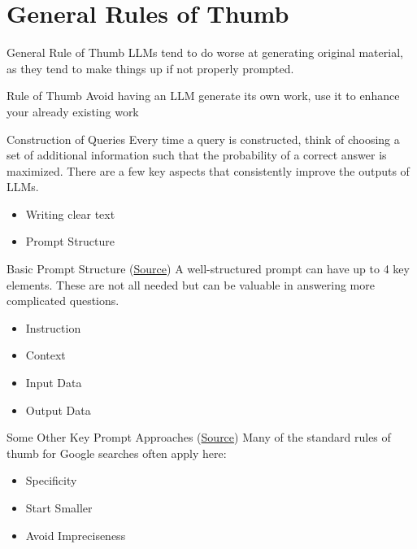 \documentclass[
	11pt, %
	aspectratio=169, %
]{beamer}
\begin{document}
\section{General Rules of Thumb}
\begin{frame}{General Rule of Thumb}\label{Rule of Thumb}
    LLMs tend to do worse at generating original material, as they tend to make things up if not properly prompted.
    \bigbreak 
    \begin{block}{Rule of Thumb}
        Avoid having an LLM generate its own work, use it to enhance your already existing work
    \end{block}
\end{frame}
\begin{frame}{Construction of Queries}
    Every time a query is constructed, think of choosing a set of additional information such that the probability of a correct answer is maximized. There are a few key aspects that consistently improve the outputs of LLMs. 
    \begin{itemize}
        \setlength{\itemsep}{20pt}
        \item Writing clear text
        \item Prompt Structure
    \end{itemize}
\end{frame}
\begin{frame}{Basic Prompt Structure (\href{https://www.promptingguide.ai/introduction/basics}{Source})}\label{Prompt Structure}
    A well-structured prompt can have up to 4 key elements. These are not all needed but can be valuable in answering more complicated questions. 
    \begin{itemize}
        \setlength{\itemsep}{20pt}
        \item Instruction
        \item Context
        \item Input Data
        \item Output Data
    \end{itemize}
\end{frame}
\begin{frame}{Some Other Key Prompt Approaches (\href{https://www.promptingguide.ai/introduction/basics}{Source})}
    Many of the standard rules of thumb for Google searches often apply here:
    \begin{itemize}
        \setlength{\itemsep}{20pt}
        \item Specificity
        \item Start Smaller
        \item Avoid Impreciseness
    \end{itemize}
\end{frame}
\end{document}
